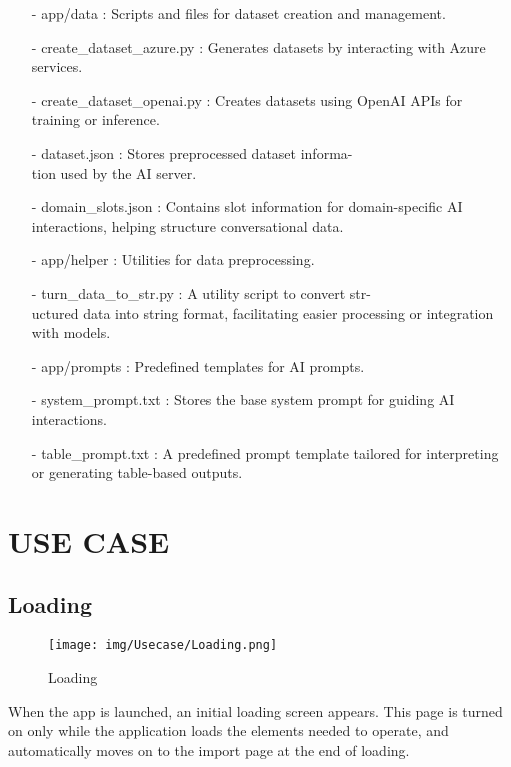\documentclass[conference]{IEEEtran}
\begin{document}
\begin{enumerate}
        \item[-] app/data : Scripts and files for dataset creation and management.\\
        \item[-] create\_dataset\_azure.py : Generates datasets by interacting with Azure services.\\
        \item[-] create\_dataset\_openai.py : Creates datasets using OpenAI APIs for training or inference.\\
        \item[-] dataset.json : Stores preprocessed dataset informa-\\tion used by the AI server.\\
        \item[-] domain\_slots.json : Contains slot information for domain-specific AI interactions, helping structure conversational data.\\
        
        \item[-] app/helper : Utilities for data preprocessing.\\
        \item[-] turn\_data\_to\_str.py : A utility script to convert str-\\uctured data into string format, facilitating easier processing or integration with models.\\
        
        \item[-] app/prompts : Predefined templates for AI prompts.\\
        \item[-] system\_prompt.txt : Stores the base system prompt for guiding AI interactions.\\
        \item[-] table\_prompt.txt : A predefined prompt template tailored for interpreting or generating table-based outputs. \\
\end{enumerate}

\section{USE CASE}
\subsection{Loading}

\begin{figure}[h]
\hspace{1.5cm}
\centering
\begin{minipage}{0.4\columnwidth}
    \texttt{[image: img/Usecase/Loading.png]}
    \caption{Loading}
\end{minipage}
\end{figure}
When the app is launched, an initial loading screen appears. This page is turned on only while the application loads the elements needed to operate, and automatically moves on to the import page at the end of loading. \\
\end{document}
